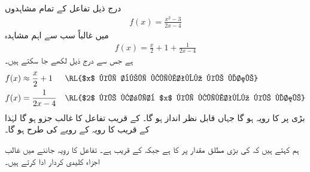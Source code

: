 درج ذیل تفاعل کے تمام مشاہدوں
\begin{align*}
f(x)=\frac{x^2-3}{2x-4}
\end{align*} 
میں غالباً سب سے اہم مشاہدہ
\begin{align*}
f(x)=\frac{x}{2}+1+\frac{1}{2x-4}
\end{align*}
ہے جس سے  درج ذیل لکھے جا سکتے ہیں۔
\begin{align*}
f(x)&\approx \frac{x}{2}+1&&\text{\RL{$x$ کی بڑی قیمتوں کے لئے}}\\
f(x)&=\frac{1}{2x-4}&&\text{\RL{$2$ کے قریب $x$ کی قیمتوں کے لئے}}
\end{align*}
بڑی  پر  کا رویہ  ہو گا جہاں  قابل نظر انداز ہو گا۔  کے قریب   تفاعل  کا غالب جزو ہو گا لہٰذا   کے قریب  کا رویہ  کے رویے کی طرح ہو گا۔ 

ہم کہتے ہیں کہ  کی بڑی مطلق مقدار پر  کا  ہے جبکہ  کے قریب   ہے۔ تفاعل کا رویہ جاننے میں غالب اجزاء کلیدی کردار ادا کرتے ہیں۔ 

